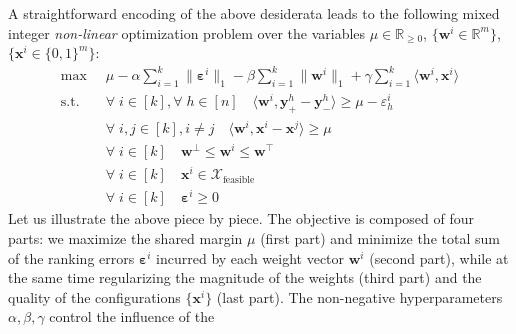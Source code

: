\documentclass{article}
\renewcommand\[{\begin{equation}}
\renewcommand\]{\end{equation}}
\newcommand{\bbR}{\mathbb{R}}
\newcommand{\calvar}[1]{\ensuremath{\mathcal{#1}}}
\newcommand{\calX}{\calvar{X}}
\newcommand{\vecvar}[1]{\ensuremath{\boldsymbol{#1}}}
\newcommand{\vw}{\vecvar{w}}
\newcommand{\vx}{\vecvar{x}}
\newcommand{\vy}{\vecvar{y}}
\newcommand{\veps}{\vecvar{\varepsilon}}
\DeclareMathOperator*{\argmax}{argmax}
\begin{document}

A straightforward encoding of the above desiderata leads to the
following mixed integer {\em non-linear} optimization problem over the
variables $\mu \in \bbR_{\ge 0}$, $\{ \vw^i \in \bbR^m \}$, $\{ \vx^i \in \{0,1\}^m \}$:
%
{\footnotesize
\begin{align}
    \max
        & \;\; \mu - \alpha \sum_{i=1}^k \| \veps^{i} \|_1 - \beta \sum_{i=1}^k \| \vw^{i} \|_1 + \gamma \sum_{i=1}^k \langle \vw^{i}, \vx^{i} \rangle
        \nonumber
    \\
    \text{s.t.}
        & \;\; \forall \; i \in [k], \forall \; h \in [n] \quad \langle \vw^{i}, \vy^{h}_+ - \vy^{h}_- \rangle \ge \mu - \varepsilon^{i}_h \label{eq:wyconstr}
    \\
        & \;\; \forall \; i, j \in [k], i \neq j \quad \langle \vw^{i}, \vx^{i} - \vx^{j} \rangle \ge \mu \label{eq:wxconstr}
    \\
        & \;\; \forall \; i \in [k] \quad \vw^\bot \le \vw^{i} \le \vw^\top \label{eq:wbounds}
    \\
        & \;\; \forall \; i \in [k] \quad \vx^{i} \in \calX_{\text{feasible}} \label{eq:xbounds}
    \\
        & \;\; \forall \; i \in [k] \quad \veps^{i} \ge 0 \nonumber
\end{align}
}
%
Let us illustrate the above piece by piece. The objective is composed
of four parts: we maximize the shared margin $\mu$ (first part) and
minimize the total sum of the ranking errors $\veps^i$ incurred by
each weight vector $\vw^{i}$ (second part), while at the same time
regularizing the magnitude of the weights (third part) and the quality
of the configurations $\{ \vx^{i} \}$ (last part). The non-negative
hyperparameters $\alpha,\beta,\gamma$ control the influence of the
\end{document}
